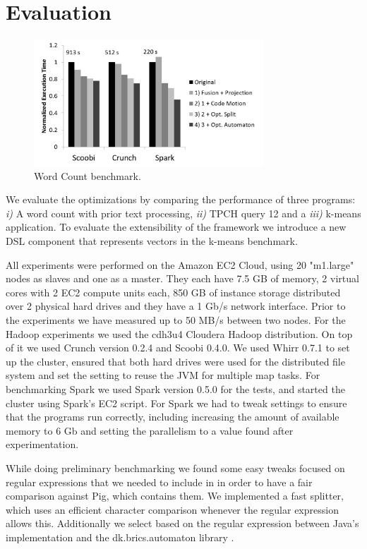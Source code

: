 \section{Evaluation}
\label{sec:evaluation}
\begin{figure}[t]
    \includegraphics[width=8.6cm]{figures/word-count}
   \caption{Word Count benchmark.}
   \label{fig:word-count}%
\end{figure}
We evaluate the optimizations by comparing the performance of three
programs:
\emph{i)} A word count with prior text processing, \emph{ii)} TPCH \cite{tpch}
query 12 and a  \emph{iii)} k-means application. To evaluate the extensibility
of the framework we introduce a new DSL component that represents vectors in the
k-means benchmark.

All experiments were performed on the Amazon EC2 Cloud, using 20 "m1.large"
nodes as slaves and one as a master. They each have 7.5 GB of memory, 2 virtual
cores with 2 EC2 compute units each, 850 GB of instance storage distributed over
2 physical hard drives and they have a 1 Gb/s network interface. Prior to the
experiments we have measured up to 50 MB/s between two nodes. For the Hadoop
experiments we used the cdh3u4 Cloudera Hadoop distribution. On top of it we
used Crunch version 0.2.4 and Scoobi 0.4.0. We used Whirr 0.7.1 \cite{whirr} to
set up the cluster, ensured that both hard drives were used for the
distributed file system and set the setting to reuse the JVM for
multiple map tasks.
For benchmarking Spark we used Spark version 0.5.0 for the tests, and
started the cluster using Spark's EC2 script.
For Spark we had to tweak settings to ensure that the programs run
correctly, including increasing the amount of available memory to 6 Gb and
setting the parallelism to a value found after experimentation.

While doing preliminary benchmarking we found some easy tweaks focused on
regular expressions that we needed to include in \tool in order to have a fair
comparison against Pig, which contains them. We implemented a fast splitter,
which uses an efficient character comparison whenever the regular expression
allows this. Additionally we select based on the regular expression between
Java's implementation and the dk.brics.automaton library \cite{mollerdk}.


